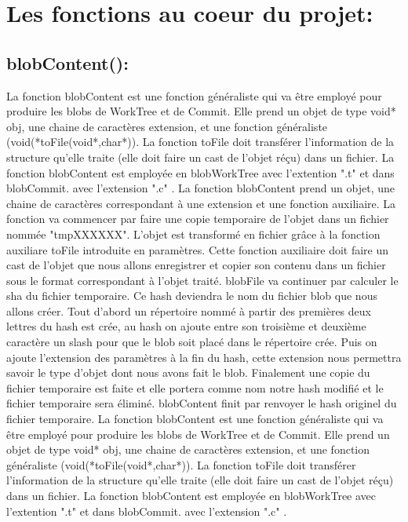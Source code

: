 \documentclass[12pt,francais]{article}
\begin{document}
\section{Les fonctions au coeur du projet:}
\subsection{blobContent():} 
	La fonction blobContent est une fonction généraliste qui va être employé pour produire les blobs de WorkTree et de Commit. Elle prend un objet de type void* obj, une chaine de caractères extension, et une fonction généraliste (void(*toFile(void*,char*)).
	La fonction toFile doit transférer l'information de la structure qu'elle traite (elle doit faire un cast de l'objet réçu) dans un fichier. La fonction blobContent est employée en blobWorkTree avec l'extention ".t" et dans blobCommit. avec l'extension ".c" .\newline
	La fonction blobContent prend un objet, une chaine de caractères correspondant à une extension et une fonction auxiliaire. La fonction va commencer par faire une copie temporaire de l'objet dans un fichier nommée  "tmpXXXXXX".  L'objet est transformé en fichier grâce à la fonction auxiliare toFile introduite en paramètres. Cette fonction auxiliaire doit faire un cast de l'objet que nous allons enregistrer et copier son contenu dans un fichier sous le format correspondant à l'objet traité. blobFile va continuer par calculer le sha du fichier temporaire. Ce hash deviendra le nom du fichier blob que nous allons créer. Tout d'abord  un répertoire nommé à partir des premières deux lettres du hash est crée, au hash on ajoute entre son troisième et deuxième caractère un slash pour que le blob soit placé dans le répertoire crée. Puis on ajoute l'extension des paramètres à la fin du hash, cette extension nous permettra savoir le type d'objet dont nous avons fait le blob. Finalement une copie du fichier temporaire est faite et elle portera comme nom notre hash modifié et le fichier temporaire sera éliminé. blobContent finit par renvoyer le hash originel du fichier temporaire.
	La fonction blobContent est une fonction généraliste qui va être employé pour produire les blobs de WorkTree et de Commit. Elle prend un objet de type void* obj, une chaine de caractères extension, et une fonction généraliste (void(*toFile(void*,char*)).
	La fonction toFile doit transférer l'information de la structure qu'elle traite (elle doit faire un cast de l'objet réçu) dans un fichier. La fonction blobContent est employée en blobWorkTree avec l'extention ".t" et dans blobCommit. avec l'extension ".c" .
\end{document}

